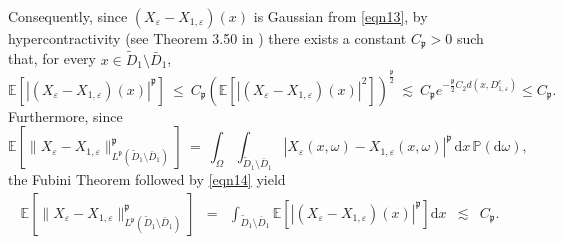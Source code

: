 \documentclass{article}
\newcommand{\mathd}{\mathrm{d}}
\begin{document}
\noindent Consequently, since $(X_{\varepsilon} - X_{1, \varepsilon}) (x)$ is Gaussian from \eqref{eqn13},
by hypercontractivity (see Theorem 3.50 in {\cite{Janson97}}) there exists a constant $C_{\mathfrak{p}} > 0$ such that, for every $x \in \tilde{D}_1 \setminus \bar{D}_1$,
%
\begin{equation}
  \mathbb{E} \left[| (X_{\varepsilon} - X_{1, \varepsilon}) (x) |^{\mathfrak{p}} \right]
  ~\leq~ C_{\mathfrak{p}} \left( \mathbb{E} \left[| (X_{\varepsilon} - X_{1, \varepsilon})
  (x) |^2 \right] \right)^{\frac{\mathfrak{p}}{2} } ~\lesssim~ C_{\mathfrak{p}} e^{-
  \frac{\mathfrak{p}}{2} C_2 d (x, D_{1, \varepsilon}^c)} \leqslant
  C_{\mathfrak{p}} . \label{eqn14}
\end{equation}
Furthermore, since 
%
$$ \mathbb{E} \left[\| X_{\varepsilon} - X_{1, \varepsilon}
\|_{L^{\mathfrak{p}} (\tilde{D}_1 \setminus \bar{D}_1)}^{\mathfrak{p}} \right] ~=~
\int_{\Omega} \int_{\tilde{D}_1 \setminus \bar{D}_1} | X_{\varepsilon} (x,
\omega) - X_{1, \varepsilon} (x, \omega) |^{\mathfrak{p}} \, \mathd x\, \mathbb{P}
(\mathd \omega),$$ 
%
the Fubini Theorem followed by \eqref{eqn14} yield
\begin{equation}
  \begin{array}{lllll}
    \mathbb{E} \left[\| X_{\varepsilon} - X_{1, \varepsilon} \|_{L^{\mathfrak{p}}
    (\tilde{D}_1 \setminus \bar{D}_1)}^{\mathfrak{p}} \right] & = & \int_{\tilde{D}_1
    \setminus \bar{D}_1} \mathbb{E} [| (X_{\varepsilon} - X_{1, \varepsilon})
    (x) |^{\mathfrak{p}}] \mathd x & \lesssim & C_{\mathfrak{p}} .
  \end{array} \label{eqn15}
\end{equation}
%
\end{document}
